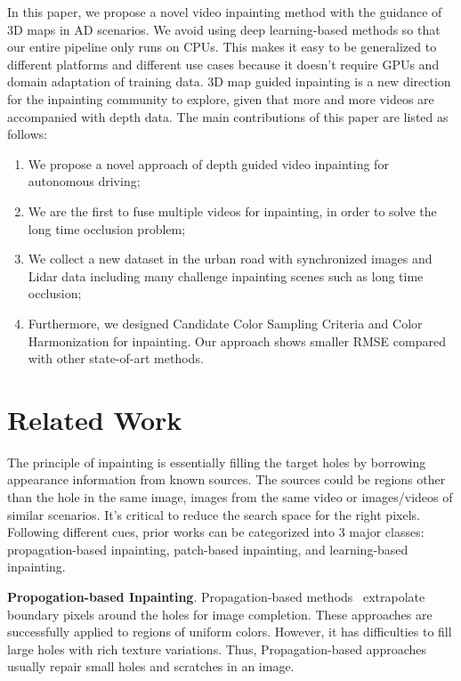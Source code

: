 \documentclass[runningheads]{llncs}
\begin{document}
In this paper, we propose a novel video inpainting method with the guidance of 3D maps in AD scenarios. We avoid using deep learning-based methods so that our entire pipeline only runs on CPUs. This makes it easy to be generalized to different platforms and different use cases because it doesn't require GPUs and domain adaptation of training data. 3D map guided inpainting is a new direction for the inpainting community to explore, given that more and more videos are accompanied with depth data. The main contributions of this paper are listed as follows:



\begin{enumerate}
\item {
We propose a novel approach of depth guided video inpainting for autonomous driving;}

\item {We are the first to fuse multiple videos for inpainting, in order to solve the long time occlusion problem;}
\item {We collect a new dataset in the urban road with synchronized images and Lidar data including many challenge inpainting scenes such as long time occlusion;}

\item {Furthermore, we designed Candidate Color Sampling Criteria and Color Harmonization for inpainting. Our approach shows smaller RMSE compared with other state-of-art methods. }
\end{enumerate}



 
\section{Related Work}

The principle of inpainting is essentially filling the target holes by borrowing appearance information from known sources. The sources could be regions other than the hole in the same image, images from the same video or images/videos of similar scenarios. It's critical to reduce the search space for the right pixels. Following different cues, prior works can be categorized into 3 major classes: propagation-based inpainting, patch-based inpainting, and learning-based inpainting. 

\textbf{Propogation-based Inpainting}. Propagation-based  methods~\cite{Ballester:2001:FJI:2318999.2320160, 2015ITIP243034E} extrapolate boundary pixels around the holes for image completion.  These approaches are successfully applied to regions of uniform colors. However, it has difficulties to fill large holes with rich texture variations. Thus, Propagation-based approaches usually repair small holes and scratches in an image. 
\end{document}
